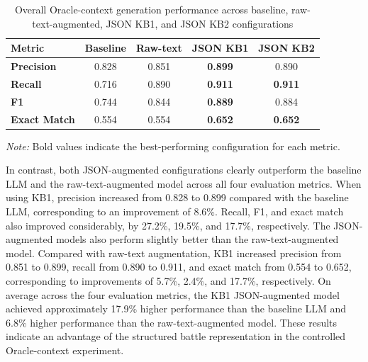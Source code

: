 \begin{table}[H]
    \centering
    \caption{Overall Oracle-context generation performance across baseline, raw-text-augmented, JSON KB1, and JSON KB2 configurations}
    \label{tab:oracle_overall_performance}

    \small
    \renewcommand{\arraystretch}{1.4}
    \setlength{\tabcolsep}{10pt}

    \begin{tabular}{l cccc}
        \toprule
        \textbf{Metric} &
        \textbf{Baseline} &
        \textbf{Raw-text} &
        \textbf{JSON KB1} &
        \textbf{JSON KB2} \\
        \midrule

        \textbf{Precision} &
        0.828 & 0.851 & \textbf{0.899} & 0.890 \\

        \textbf{Recall} &
        0.716 & 0.890 & \textbf{0.911} & \textbf{0.911} \\

        \textbf{F1} &
        0.744 & 0.844 & \textbf{0.889} & 0.884 \\

        \textbf{Exact Match} &
        0.554 & 0.554 & \textbf{0.652} & \textbf{0.652} \\

        \bottomrule
    \end{tabular}

    \par\vspace{4pt}
    \begin{minipage}{0.9\textwidth}
        \footnotesize
        \textit{Note:} Bold values indicate the
        best-performing configuration for each metric.
    \end{minipage}

\end{table}
In contrast, both JSON-augmented configurations clearly outperform the baseline LLM and the raw-text-augmented model across all four evaluation metrics. When using KB1, precision increased from 0.828 to 0.899 compared with the baseline LLM, corresponding to an improvement of 8.6\%. Recall, F1, and exact match also improved considerably, by 27.2\%, 19.5\%, and 17.7\%, respectively. The JSON-augmented models also perform slightly better than the raw-text-augmented model. Compared with raw-text augmentation, KB1 increased precision from 0.851 to 0.899, recall from 0.890 to 0.911, and exact match from 0.554 to 0.652, corresponding to improvements of 5.7\%, 2.4\%, and 17.7\%, respectively. On average across the four evaluation metrics, the KB1 JSON-augmented model achieved approximately 17.9\% higher performance than the baseline LLM and 6.8\% higher performance than the raw-text-augmented model. These results indicate an advantage of the structured battle representation in the controlled Oracle-context experiment.
